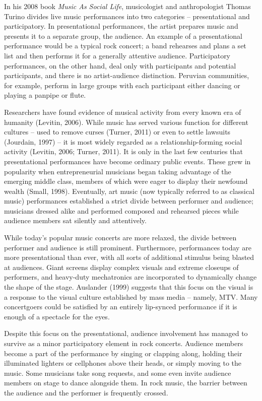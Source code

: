 In his 2008 book \textit{Music As Social Life}, musicologist and anthropologist Thomas Turino divides live music performances into two categories -- presentational and participatory. In presentational performances, the artist prepares music and presents it to a separate group, the audience. An example of a presentational performance would be a typical rock concert; a band rehearses and plans a set list and then performs it for a generally attentive audience. Participatory performances, on the other hand, deal only with participants and potential participants, and there is no artist-audience distinction. Peruvian communities, for example, perform in large groups with each participant either dancing or playing a panpipe or flute.

Researchers have found evidence of musical activity from every known era of humanity (Levitin, 2006). While music has served various function for different cultures -- used to remove curses (Turner, 2011) or even to settle lawsuits (Jourdain, 1997) -- it is most widely regarded as a relationship-forming social activity (Levitin, 2006; Turner, 2011). It is only in the last few centuries that presentational performances have become ordinary public events. These grew in popularity when entrepreneurial musicians began taking advantage of the emerging middle class, members of which were eager to display their newfound wealth (Small, 1998). Eventually, art music (now typically referred to as classical music) performances established a strict divide between performer and audience; musicians dressed alike and performed composed and rehearsed pieces while audience members sat silently and attentively.

While today's popular music concerts are more relaxed, the divide between performer and audience is still prominent. Furthermore, performances today are more presentational than ever, with all sorts of additional stimulus being blasted at audiences. Giant screens display complex visuals and extreme closeups of performers, and heavy-duty mechatronics are incorporated to dynamically change the shape of the stage. Auslander (1999) suggests that this focus on the visual is a response to the visual culture established by mass media -- namely, MTV. Many concertgoers could be satisfied by an entirely lip-synced performance if it is enough of a spectacle for the eyes.

Despite this focus on the presentational, audience involvement has managed to survive as a minor participatory element in rock concerts. Audience members become a part of the performance by singing or clapping along, holding their illuminated lighters or cellphones above their heads, or simply moving to the music. Some musicians take song requests, and some even invite audience members on stage to dance alongside them. In rock music, the barrier between the audience and the performer is frequently crossed.

